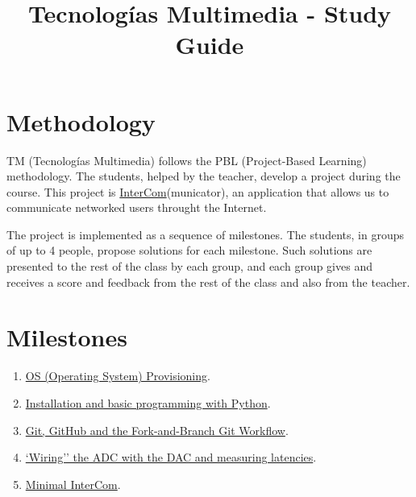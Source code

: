 \title{Tecnologías Multimedia - Study Guide}

\maketitle

\section{Methodology}
TM (Tecnologías Multimedia) follows the PBL (Project-Based Learning) methodology. The students,
helped by the teacher, develop a project during the course. This
project
is \href{https://github.com/Tecnologias-multimedia/intercom}{InterCom}(municator),
an application that allows us to communicate networked users throught
the Internet.

The project is implemented as a sequence of milestones. The students,
in groups of up to 4 people, propose solutions for each
milestone. Such solutions are presented to the rest of the class by
each group, and each group gives and receives a score and feedback
from the rest of the class and also from the teacher.

\section{Milestones}
\begin{enumerate}
\item \href{https://tecnologias-multimedia.github.io/study_guide/milestone00/}{OS (Operating System) Provisioning}.
\item \href{https://tecnologias-multimedia.github.io/study_guide/milestone01/}{Installation and basic programming with Python}.
\item \href{https://tecnologias-multimedia.github.io/study_guide/milestone02/}{Git, GitHub and the Fork-and-Branch Git Workflow}.
\item \href{https://tecnologias-multimedia.github.io/study_guide/milestone03/}{`Wiring'' the ADC with the DAC and measuring latencies}.
\item \href{https://tecnologias-multimedia.github.io/study_guide/milestone04/}{Minimal InterCom}.
\end{enumerate}

